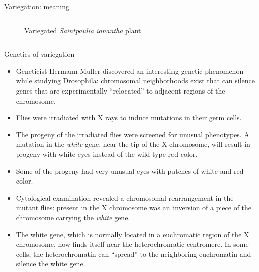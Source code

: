 \documentclass[11pt,dvipsnames,ignorenonframetext,aspectratio=169]{beamer}
\providecommand{\tightlist}{%
  \setlength{\itemsep}{0pt}\setlength{\parskip}{0pt}}
\begin{document}
\begin{frame}{Variegation: meaning}
\begin{columns}[T,onlytextwidth]
\begin{figure}
{}

\caption{Variegated \textit{Saintpaulia ionantha} plant}\label{fig:variegated-saintpaulia}
\end{figure}

\end{columns}

\end{frame}

\begin{frame}{Genetics of variegation}
\protect\hypertarget{genetics-of-variegation}{}

\begin{itemize}
\tightlist
\item
  Geneticist Hermann Muller discovered an interesting genetic phenomenon
  while studying Drosophila: chromosomal neighborhoods exist that can
  silence genes that are experimentally ``relocated'' to adjacent
  regions of the chromosome.
\item
  Flies were irradiated with X rays to induce mutations in their germ
  cells.
\item
  The progeny of the irradiated flies were screened for unusual
  phenotypes. A mutation in the \emph{white} gene, near the tip of the X
  chromosome, will result in progeny with white eyes instead of the
  wild-type red color.
\item
  Some of the progeny had very unusual eyes with patches of white and
  red color.
\item
  Cytological examination revealed a chromosomal rearrangement in the
  mutant flies: present in the X chromosome was an inversion of a piece
  of the chromosome carrying the \emph{white} gene.
\item
  The white gene, which is normally located in a euchromatic region of
  the X chromosome, now finds itself near the heterochromatic
  centromere. In some cells, the heterochromatin can ``spread'' to the
  neighboring euchromatin and silence the white gene.
\end{itemize}

\end{frame}
\end{document}
